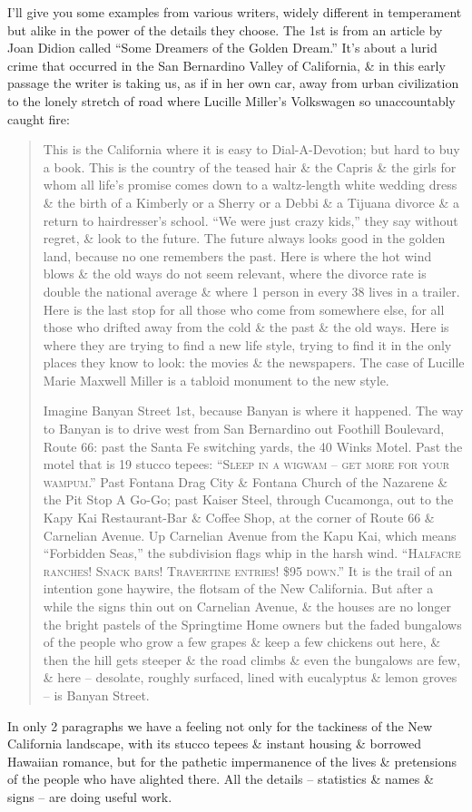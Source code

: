 \documentclass{article}
\begin{document}
I'll give you some examples from various writers, widely different in temperament but alike in the power of the details they choose. The 1st is from an article by Joan Didion called ``Some Dreamers of the Golden Dream.'' It's about a lurid crime that occurred in the San Bernardino Valley of California, \& in this early passage the writer is taking us, as if in her own car, away from urban civilization to the lonely stretch of road where Lucille Miller's Volkswagen so unaccountably caught fire:
\begin{quotation}
	This is the California where it is easy to Dial-A-Devotion; but hard to buy a book. This is the country of the teased hair \& the Capris \& the girls for whom all life's promise comes down to a waltz-length white wedding dress \& the birth of a Kimberly or a Sherry or a Debbi \& a Tijuana divorce \& a return to hairdresser's school. ``We were just crazy kids,'' they say without regret, \& look to the future. The future always looks good in the golden land, because no one remembers the past. Here is where the hot wind blows \& the old ways do not seem relevant, where the divorce rate is double the national average \& where 1 person in every 38 lives in a trailer. Here is the last stop for all those who come from somewhere else, for all those who drifted away from the cold \& the past \& the old ways. Here is where they are trying to find a new life style, trying to find it in the only places they know to look: the movies \& the newspapers. The case of Lucille Marie Maxwell Miller is a tabloid monument to the new style.
	
	Imagine Banyan Street 1st, because Banyan is where it happened. The way to Banyan is to drive west from San Bernardino out Foothill Boulevard, Route 66: past the Santa Fe switching yards, the 40 Winks Motel. Past the motel that is 19 stucco tepees: ``\textsc{Sleep in a wigwam -- get more for your wampum}.'' Past Fontana Drag City \& Fontana Church of the Nazarene \& the Pit Stop A Go-Go; past Kaiser Steel, through Cucamonga, out to the Kapy Kai Restaurant-Bar \& Coffee Shop, at the corner of Route 66 \& Carnelian Avenue. Up Carnelian Avenue from the Kapu Kai, which means ``Forbidden Seas,'' the subdivision flags whip in the harsh wind. ``\textsc{Halfacre ranches! Snack bars! Travertine entries! \$95 down}.'' It is the trail of an intention gone haywire, the flotsam of the New California. But after a while the signs thin out on Carnelian Avenue, \& the houses are no longer the bright pastels of the Springtime Home owners but the faded bungalows of the people who grow a few grapes \& keep a few chickens out here, \& then the hill gets steeper \& the road climbs \& even the bungalows are few, \& here -- desolate, roughly surfaced, lined with eucalyptus \& lemon groves -- is Banyan Street.
\end{quotation}
In only 2 paragraphs we have a feeling not only for the tackiness of the New California landscape, with its stucco tepees \& instant housing \& borrowed Hawaiian romance, but for the pathetic impermanence of the lives \& pretensions of the people who have alighted there. All the details -- statistics \& names \& signs -- are doing useful work.
\end{document}
